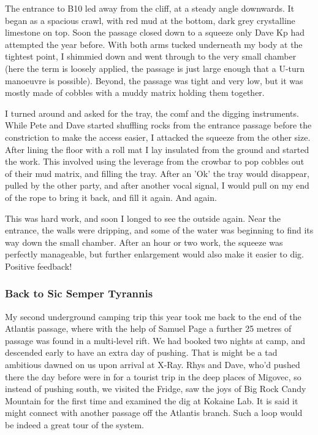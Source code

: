 \documentclass[onecolumn]{book}
\begin{document}
The entrance to B10 led away from the cliff, at a steady angle downwards. It began as a spacious crawl, with red mud at the bottom, dark grey crystalline limestone on top. Soon the passage closed down to a squeeze only Dave Kp had attempted the year before. With both arms tucked underneath my body at the tightest point, I shimmied down and went through to the very small chamber (here the term is loosely applied, the passage is just large enough that a U-turn manoeuvre is possible). Beyond, the passage was tight and very low, but it was mostly made of cobbles with a muddy matrix holding them together. 

I turned around and asked for the tray, the comf and the digging instruments. While Pete and Dave started shuffling rocks from the entrance passage before the constriction to make the access easier, I attacked the squeeze from the other size. After lining the floor with a roll mat I lay insulated from the ground and started the work. This involved using the leverage from the crowbar to pop cobbles out of their mud matrix, and filling the tray. After an 'Ok' the tray would disappear, pulled by the other party, and after another vocal signal, I would pull on my end of the rope to bring it back, and fill it again. And again. 

This was hard work, and soon I longed to see the outside again. Near the entrance, the walls were dripping, and some of the water was beginning to find its way down the small chamber. After an hour or two work, the squeeze was perfectly manageable, but further enlargement would also make it easier to dig. Positive feedback!

\subsubsection{Back to Sic Semper Tyrannis}
My second underground camping trip this year took me back to the end of the Atlantis passage, where with the help of Samuel Page a further 25 metres of passage was found in a multi-level rift. We had booked two nights at camp, and descended early to have an extra day of pushing. That is might be a tad ambitious dawned on us upon arrival at X-Ray. Rhys and Dave, who'd pushed there the day before were in for a tourist trip in the deep places of Migovec, so instead of pushing south, we visited the Fridge, saw the joys of Big Rock Candy Mountain for the first time and examined the dig at Kokaine Lab. It is said it might connect with another passage off the Atlantis branch. Such a loop would be indeed a great tour of the system.
\end{document}
